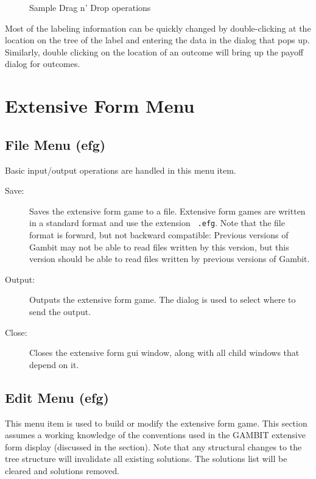 \begin{figure}
\caption{Sample Drag n' Drop operations}
\end{figure}

Most of the labeling information can be quickly changed by
double-clicking at the location on the tree of the label and entering
the data in the dialog that pops up.  Similarly, double clicking on
the location of an outcome will bring up the payoff dialog for
outcomes.

\section{Extensive Form Menu}

\subsection{File Menu (efg)}\label{effile}

Basic input/output operations are handled in this menu item.  

\begin{description}
\item[Save:] Saves the extensive form game to a file.  Extensive form
games are written in a standard format and use the extension {\tt 
.efg}. Note that the file format is forward, but not backward compatible:
Previous versions of Gambit may not be able to read files written by
this version, but this version should be able to read files written by
previous versions of Gambit.
\item[Output:] Outputs the extensive form game.  The  dialog is used to select where to send the output.
\item[Close:] Closes the extensive form gui window, along with all
child windows that depend on it.
\end{description}

\subsection{Edit Menu (efg)}\label{efedit}
This menu item is used to build or modify the extensive form game.
This section assumes a working knowledge of the conventions used in
the GAMBIT extensive form display (discussed in the  section).  Note that any structural changes to the
tree structure will invalidate all existing solutions.  The solutions
list will be cleared and solutions removed.


